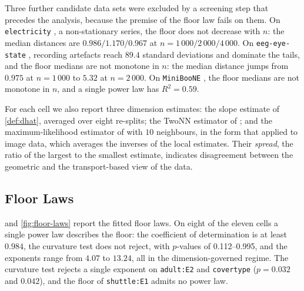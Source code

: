 \documentclass[twoside,11pt]{article}
\theoremstyle{plain}
\theoremstyle{definition}
\theoremstyle{remark}
\begin{document}
Three further candidate data sets were excluded by a screening step that
precedes the analysis, because the premise of the floor law fails on them.
On \texttt{electricity} \citep{gama2004}, a non-stationary series, the
floor does not decrease with $n$: the median distances are
$0.986/1.170/0.967$ at $n = 1\,000/2\,000/4\,000$. On
\texttt{eeg-eye-state} \citep{kelly2026}, recording artefacts reach
$89.4$ standard deviations and dominate the tails, and the floor medians are
not monotone in $n$: the median distance jumps from $0.975$ at $n = 1\,000$ to
$5.32$ at $n = 2\,000$. On \texttt{MiniBooNE} \citep{roe2005}, the floor medians are not
monotone in $n$, and a single power law has $R^2 = 0.59$.

For each cell we also report three dimension estimates: the slope estimate
of \cref{def:dhat}, averaged over eight re-splits; the TwoNN estimator of
\citet{facco2017}; and the maximum-likelihood estimator of
\citet{levina2004} with $10$ neighbours, in the form that \citet{pope2021}
applied to image data, which averages the inverses of the local estimates. Their \emph{spread}, the ratio of the largest to the smallest estimate,
indicates disagreement between the geometric and the transport-based view
of the data.

\subsection{Floor Laws}\label{sec:empirical-floor-laws}

 and \cref{fig:floor-laws} report the fitted floor laws.
On eight of the eleven cells a single power law describes the floor: the
coefficient of determination is at least $0.984$, the curvature test
does not reject, with $p$-values of 0.112--0.995, and the exponents
range from $4.07$ to $13.24$, all in the dimension-governed
regime. The curvature test rejects a single exponent on \texttt{adult:E2}
and \texttt{covertype} ($p = 0.032$ and $0.042$), and the floor of
\texttt{shuttle:E1} admits no power law.
\end{document}
